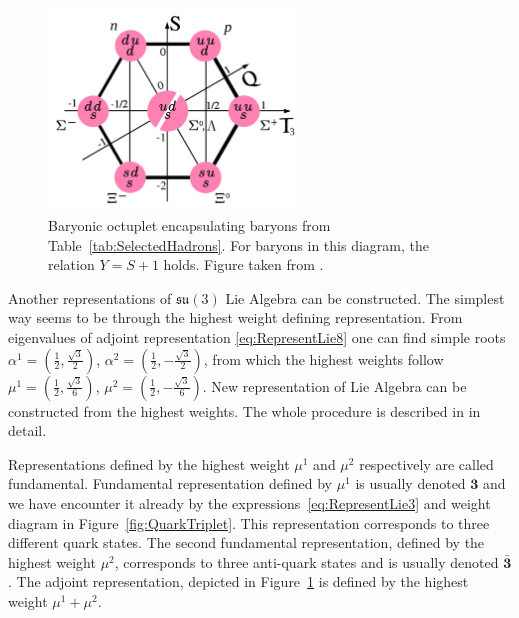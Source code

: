 \begin{figure}
  \centering
  \includegraphics[width=0.6\textwidth]{Chapter1/Baryon-octet.png} 
  \caption[Baryonic octuplet encapsulating baryons from
          Table~\ref{tab:SelectedHadrons}. For baryons in this diagram, the relation $Y
          = S + 1$ holds.]
          {Baryonic octuplet encapsulating baryons from
          Table~\ref{tab:SelectedHadrons}. For baryons in this diagram, the
          relation $Y = S + 1$ holds. Figure taken from \cite{wiki:EightFoldWay}.}
  \label{fig:BaryonicOctet}
\end{figure}

Another representations of $\mathfrak{su}(3)$ Lie Algebra can be constructed.
The simplest way seems to be through the highest weight defining representation.
From eigenvalues of adjoint representation \eqref{eq:RepresentLie8} one can find
simple roots 
$\alpha^1=\left( \frac{1}{2}, \frac{\sqrt{3}}{2} \right)$, 
$\alpha^2=\left( \frac{1}{2}, - \frac{\sqrt{3}}{2} \right)$, 
from which the highest weights follow
$\mu^1=\left( \frac{1}{2}, \frac{\sqrt{3}}{6} \right)$, 
$\mu^2=\left( \frac{1}{2}, - \frac{\sqrt{3}}{6} \right)$. 
New representation of Lie Algebra can be constructed from the highest weights.
The whole procedure is described in \cite{LieAlgebrasForParticlePhysicists} in
detail.

Representations defined by the highest weight $\mu^1$ and $\mu^2$ respectively are
called fundamental. Fundamental representation defined by $\mu^1$ is usually
denoted $\mathbf{3}$ and we have encounter it already by the
expressions~\eqref{eq:RepresentLie3} and weight diagram in
Figure~\ref{fig:QuarkTriplet}. This representation corresponds to three
different quark states.  
The second fundamental representation, defined by the highest weight $\mu^2$,
corresponds to three anti-quark states and is usually denoted
$\bar{\mathbf{3}}$. 
The adjoint representation, depicted in Figure~\ref{fig:BaryonicOctet} is
defined by the highest weight $\mu^1 + \mu^2$.

